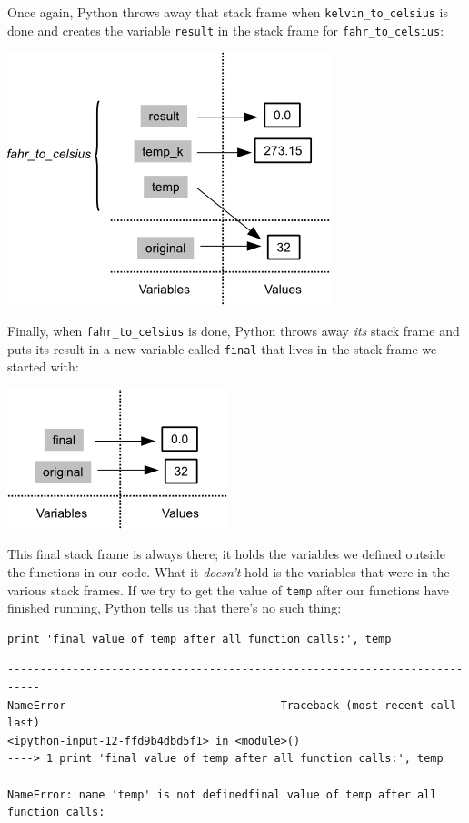 \documentclass{book}
\begin{document}
Once again, Python throws away that stack frame when
\texttt{kelvin\_to\_celsius} is done and creates the variable
\texttt{result} in the stack frame for \texttt{fahr\_to\_celsius}:

\includegraphics{novice/python/img/python-call-stack-06.png}

Finally, when \texttt{fahr\_to\_celsius} is done, Python throws away
\emph{its} stack frame and puts its result in a new variable called
\texttt{final} that lives in the stack frame we started with:

\includegraphics{novice/python/img/python-call-stack-07.png}

This final stack frame is always there; it holds the variables we
defined outside the functions in our code. What it \emph{doesn't} hold
is the variables that were in the various stack frames. If we try to get
the value of \texttt{temp} after our functions have finished running,
Python tells us that there's no such thing:

\begin{verbatim}
print 'final value of temp after all function calls:', temp
\end{verbatim}

\begin{verbatim}
---------------------------------------------------------------------------
NameError                                 Traceback (most recent call last)
<ipython-input-12-ffd9b4dbd5f1> in <module>()
----> 1 print 'final value of temp after all function calls:', temp

NameError: name 'temp' is not definedfinal value of temp after all function calls:
\end{verbatim}
\end{document}
